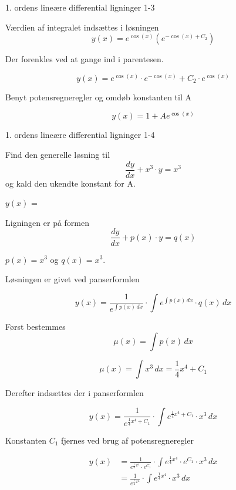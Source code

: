 \documentclass{article}
\begin{document}
\begin{exercise}{1. ordens lineære differential ligninger 1-3}
	\hint
	
	Værdien af integralet indsættes i løsningen
	\[
	y(x) = e^{\cos(x)} \left( e^{- \cos(x) + C_2}\right)
	\]
	
	\hint
	
	Der forenkles ved at gange ind i parentesen.
	
	\hint
	\[
	y(x) = e^{\cos(x)} \cdot e^{- \cos(x)} + C_2 \cdot e^{\cos(x)} 
	\]
	
	\hint
	
	Benyt potensregneregler og omdøb konstanten til A
	
	\hint
	\[
	y(x) = 1 + A e^{\cos(x)}
	\]
	
	
\end{exercise}

\newpage

\begin{exercise}{1. ordens lineære differential ligninger 1-4}
	
	
	Find den generelle løsning til
	\[
	\frac{dy}{dx} + x^3 \cdot y = x^3
	\]
	og kald den ukendte konstant for A.
	
	$y(x)$ =  \\
	
	
	
	\hint
	
	Ligningen er på formen
	\[
	\frac{dy}{dx} + p(x) \cdot y = q(x)
	\]
	
	\hint
	
	$p(x)=x^3$ og $q(x)=x^3$.
	
	\hint
	
	Løsningen er givet ved panserformlen
	
	
	\hint
	
	\[
	y(x) = \frac{1}{e^{\int p(x) \, dx}} \cdot \int e^{\int p(x) \, dx}  \cdot q(x) \, dx
	\]
	
	\hint
	
	Først bestemmes 
	\[
	\mu(x) = \int p(x) \, dx
	\]
	
	\hint
	\[
	\mu(x) = \int x^3 \, dx = \frac{1}{4} x^4 + C_1
	\]
	
	\hint
	Derefter indsættes der i  panserformlen
	
	\hint
	
	\[
	y(x) = \frac{1}{e^{\frac{1}{4}x^4 + C_1}} \cdot \int e^{\frac{1}{4}x^4 + C_1}  \cdot x^3 \, dx
	\]
	
	
	\hint
	
	Konstanten $C_1$ fjernes ved brug af potensregneregler
	
	\hint
	\begin{align*}
	y(x) &= \frac{1}{e^{\frac{1}{4}x^4} \cdot e^{C_1}} \cdot \int e^{\frac{1}{4}x^4} \cdot e^{C_1}  \cdot x^3 \, dx  \\
	&= \frac{1}{e^{\frac{1}{4}x^4}} \cdot \int e^{\frac{1}{4}x^4}  \cdot x^3 \, dx
	\end{align*}
	

\end{exercise}
\end{document}
